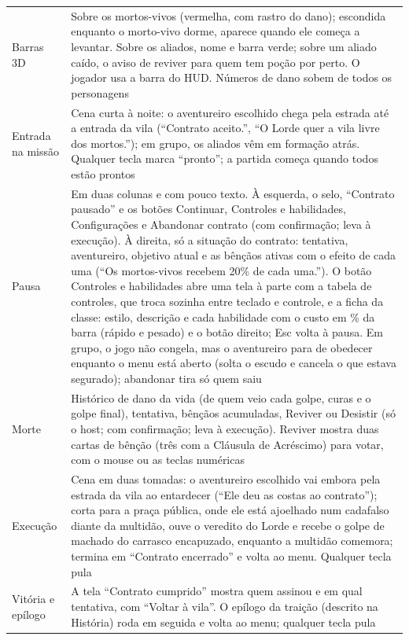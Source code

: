 \documentclass[11pt,a4paper]{article}
\begin{document}
\begin{xltabular}{\textwidth}{@{}lX@{}}
Barras 3D & Sobre os mortos-vivos (vermelha, com rastro do dano); escondida enquanto o morto-vivo dorme, aparece quando ele começa a levantar. Sobre os aliados, nome e barra verde; sobre um aliado caído, o aviso de reviver para quem tem poção por perto. O jogador usa a barra do HUD. Números de dano sobem de todos os personagens \\
Entrada na missão & Cena curta à noite: o aventureiro escolhido chega pela estrada até a entrada da vila (``Contrato aceito.'', ``O Lorde quer a vila livre dos mortos.''); em grupo, os aliados vêm em formação atrás. Qualquer tecla marca ``pronto''; a partida começa quando todos estão prontos \\
Pausa & Em duas colunas e com pouco texto. À esquerda, o selo, ``Contrato pausado'' e os botões Continuar, Controles e habilidades, Configurações e Abandonar contrato (com confirmação; leva à execução). À direita, só a situação do contrato: tentativa, aventureiro, objetivo atual e as bênçãos ativas com o efeito de cada uma (``Os mortos-vivos recebem 20\% de cada uma.''). O botão Controles e habilidades abre uma tela à parte com a tabela de controles, que troca sozinha entre teclado e controle, e a ficha da classe: estilo, descrição e cada habilidade com o custo em \% da barra (rápido e pesado) e o botão direito; Esc volta à pausa. Em grupo, o jogo não congela, mas o aventureiro para de obedecer enquanto o menu está aberto (solta o escudo e cancela o que estava segurado); abandonar tira só quem saiu \\
Morte & Histórico de dano da vida (de quem veio cada golpe, curas e o golpe final), tentativa, bênçãos acumuladas, Reviver ou Desistir (só o host; com confirmação; leva à execução). Reviver mostra duas cartas de bênção (três com a Cláusula de Acréscimo) para votar, com o mouse ou as teclas numéricas \\
Execução & Cena em duas tomadas: o aventureiro escolhido vai embora pela estrada da vila ao entardecer (``Ele deu as costas ao contrato''); corta para a praça pública, onde ele está ajoelhado num cadafalso diante da multidão, ouve o veredito do Lorde e recebe o golpe de machado do carrasco encapuzado, enquanto a multidão comemora; termina em ``Contrato encerrado'' e volta ao menu. Qualquer tecla pula \\
Vitória e epílogo & A tela ``Contrato cumprido'' mostra quem assinou e em qual tentativa, com ``Voltar à vila''. O epílogo da traição (descrito na História) roda em seguida e volta ao menu; qualquer tecla pula \\
\bottomrule
\end{xltabular}
\end{document}
